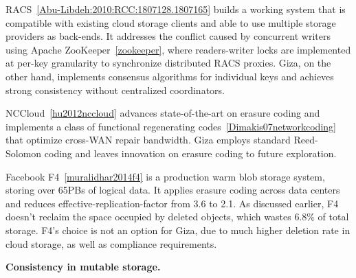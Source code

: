 RACS~\ref{Abu-Libdeh:2010:RCC:1807128.1807165} 
builds a working system that is compatible with existing cloud storage clients and able to use multiple storage providers as back-ends.
It addresses the conflict caused by concurrent writers using Apache ZooKeeper~\ref{zookeeper}, where readers-writer locks are implemented at per-key granularity to synchronize distributed RACS proxies.
Giza, on the other hand, implements consensus algorithms for individual keys and achieves strong consistency without centralized coordinators.

NCCloud~\ref{hu2012nccloud} advances state-of-the-art on erasure coding and implements a class of functional regenerating codes~\ref{Dimakis07networkcoding} that optimize cross-WAN repair bandwidth. Giza employs standard Reed-Solomon coding and leaves innovation on erasure coding to future exploration.

Facebook F4~\ref{muralidhar2014f4} is a production warm blob storage system, storing over 65PBs of logical data. It applies erasure coding across data centers and reduces effective-replication-factor from 3.6 to 2.1. As discussed earlier, F4 doesn't reclaim the space occupied by deleted objects, which wastes $6.8\%$ of total storage. F4's choice is not an option for Giza, due to much higher deletion rate in cloud storage, as well as compliance requirements.



{\bf Consistency in mutable storage.}

